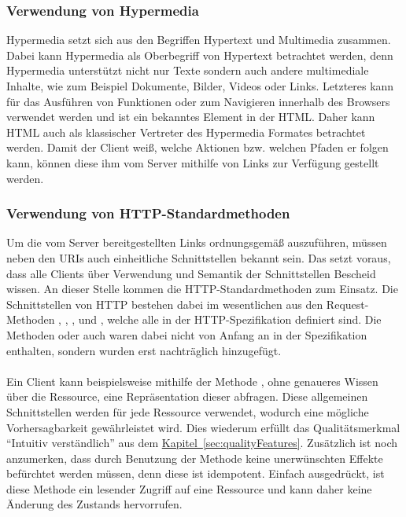 \subsubsection{Verwendung von Hypermedia}
Hypermedia setzt sich aus den Begriffen Hypertext und Multimedia zusammen. Dabei kann Hypermedia als Oberbegriff von Hypertext betrachtet werden, denn Hypermedia unterstützt nicht nur Texte sondern auch andere multimediale Inhalte, wie zum Beispiel Dokumente, Bilder, Videos oder Links. Letzteres kann für das Ausführen von Funktionen oder zum Navigieren innerhalb des Browsers verwendet werden und ist ein bekanntes Element in der \gls{HTML}. Daher kann \gls{HTML} auch als klassischer Vertreter des Hypermedia Formates betrachtet werden. Damit der Client weiß, welche Aktionen bzw. welchen Pfaden er folgen kann, können diese ihm vom Server mithilfe von Links zur Verfügung gestellt werden.

\subsubsection{Verwendung von HTTP-Standardmethoden}
Um die vom Server bereitgestellten Links ordnungsgemäß auszuführen, müssen neben den \glspl{URI} auch einheitliche Schnittstellen bekannt sein. Das setzt voraus, dass alle Clients über Verwendung und Semantik der Schnittstellen Bescheid wissen. An dieser Stelle kommen die \gls{HTTP}-Standardmethoden zum Einsatz. Die Schnittstellen von \gls{HTTP} bestehen dabei im wesentlichen aus den Request-Methoden , , ,  und , welche alle in der \gls{HTTP}-Spezifikation \cite{httpSpecification} definiert sind. Die Methoden  oder auch  waren dabei nicht von Anfang an in der Spezifikation enthalten, sondern wurden erst nachträglich hinzugefügt.\\
\\
Ein Client kann beispielsweise mithilfe der Methode , ohne genaueres Wissen über die Ressource, eine Repräsentation dieser abfragen. Diese allgemeinen Schnittstellen werden für jede Ressource verwendet, wodurch eine mögliche Vorhersagbarkeit gewährleistet wird. Dies wiederum erfüllt das Qualitätsmerkmal \enquote{Intuitiv verständlich} aus dem \hyperref[sec:qualityFeatures]{Kapitel~\ref{sec:qualityFeatures}}. Zusätzlich ist noch anzumerken, dass durch Benutzung der Methode  keine unerwünschten Effekte befürchtet werden müssen, denn diese ist idempotent. Einfach ausgedrückt, ist diese Methode ein lesender Zugriff auf eine Ressource und kann daher keine Änderung des Zustands hervorrufen.

